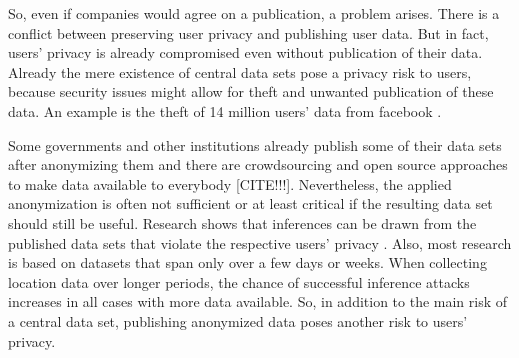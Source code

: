 So, even if companies would agree on a publication, a problem arises.
There is a conflict between preserving user privacy and publishing user data.
But in fact, users' privacy is already compromised even without publication of their data. Already the mere existence of central data sets pose a privacy risk to users, because security issues might allow for theft and unwanted publication of these data.
An example is the theft of 14 million users' data from facebook \parencite{facebook}.

Some governments and other institutions already publish some of their data sets after anonymizing them 
and there are crowdsourcing and open source approaches to make data available to everybody [CITE!!!]. 
Nevertheless, the applied anonymization is often not sufficient or at least critical if the resulting data set should still be useful. Research shows that inferences can be drawn from the published data sets that violate the respective users' privacy \parencite{cellphone, twitter}. Also, most research is based on datasets that span only over a few days or weeks. When collecting location data over longer periods, the chance of successful inference attacks increases in all cases with more data available. So, in addition to the main risk of a central data set, publishing anonymized data poses another risk to users' privacy.


